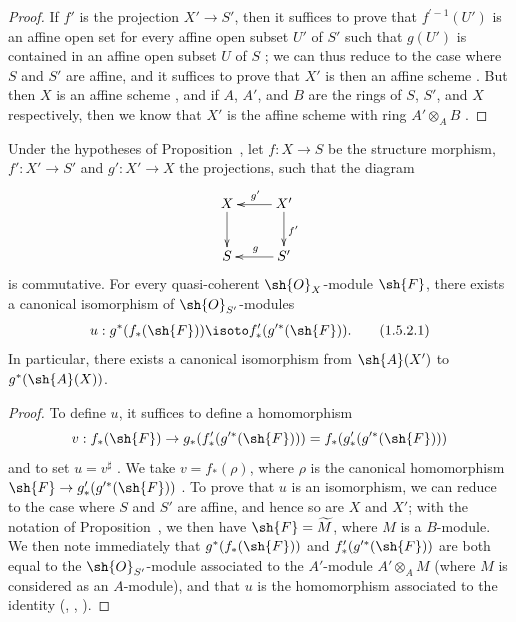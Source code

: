 \begin{proof}
If $f'$ is the projection $X'\to S'$, then it suffices to prove that $f^{\prime-1}(U')$ is an affine open set for every affine open subset $U'$ of $S'$ such that $g(U')$ is contained in an affine open subset $U$ of $S$ ; we can thus reduce to the case where $S$ and $S'$ are affine, and it suffices to prove that $X'$ is then an affine scheme .
But then $X$ is an affine scheme , and if $A$, $A'$, and $B$ are the rings of $S$, $S'$, and $X$ respectively, then we know that $X'$ is the affine scheme with ring $A'\otimes_A B$ .
\end{proof}

\begin{corollary}[1.5.2]
\label{II.1.5.2}
Under the hypotheses of Proposition~, let $f:X\to S$ be the structure morphism, $f':X'\to S'$ and $g':X'\to X$ the projections, such that the diagram
\[
  \xymatrix{
    X\ar[d] &
    X'\ar[l]_{g'}\ar[d]^{f'}\\
    S &
    S'\ar[l]_g
  }
\]
is commutative.
For every quasi-coherent $\sh{O}_X$-module $\sh{F}$, there exists a canonical isomorphism of $\sh{O}_{S'}$-modules
\[
\label{II.1.5.2.1}
  u:g^*(f_*(\sh{F}))\isoto f'_*(g^{\prime*}(\sh{F})).
  \tag{1.5.2.1}
\]
In particular, there exists a canonical isomorphism from $\sh{A}(X')$ to $g^*(\sh{A}(X))$.
\end{corollary}

\begin{proof}
To define $u$, it suffices to define a homomorphism
\[
  v:f_*(\sh{F})\to g_*(f'_*(g^{\prime*}(\sh{F})))=f_*(g'_*(g^{\prime*}(\sh{F})))
\]
and to set $u=v^\sharp$ .
We take $v=f_*(\rho)$, where $\rho$ is the canonical homomorphism $\sh{F}\to g'_*(g^{\prime*}(\sh{F}))$ .
To prove that $u$ is an isomorphism, we can reduce to the case where $S$ and $S'$ are affine, and hence so are $X$ and $X'$; with the notation of Proposition~, we then have $\sh{F}=\widetilde{M}$, where $M$ is a $B$-module.
We then note immediately that $g^*(f_*(\sh{F}))$ and $f'_*(g^{\prime*}(\sh{F}))$ are both equal to the $\sh{O}_{S'}$-module associated to the $A'$-module $A'\otimes_A M$ (where $M$ is considered as an $A$-module), and that $u$ is the homomorphism associated to the identity (, , ).
\end{proof}


